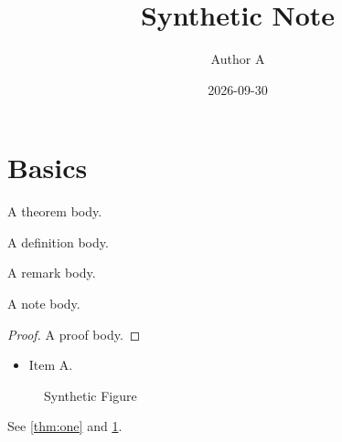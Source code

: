 \documentclass[lang=en,device=normal,color=blue]{elegantnote}
\title{Synthetic Note}
\author{Author A}
\institute{Synthetic Institute}
\date{2026-09-30}
\begin{document}
\maketitle
\tableofcontents
\section{Basics}\label{sec:intro}
\begin{theorem}[Finite]\label{thm:one}
A theorem body.
\end{theorem}
\begin{definition}[Set]\label{def:one}
A definition body.
\end{definition}
\begin{remark}
A remark body.
\end{remark}
\begin{note}
A note body.
\end{note}
\begin{proof}
A proof body.
\end{proof}
\begin{itemize}\item Item A.\end{itemize}
\begin{figure}\centering\caption{Synthetic Figure}\label{fig:one}\end{figure}
See \ref{thm:one} and \ref{fig:one}.
\end{document}
